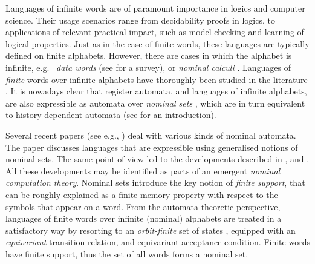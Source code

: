 


Languages of infinite words are of paramount importance in logics and computer science. Their usage scenarios range from decidability proofs in logics, 
 to applications of relevant practical impact, such as model checking and learning of logical properties. Just as in the case of finite words, these languages are typically defined on finite alphabets. However, there are cases in which the alphabet is infinite, e.g.\
\emph{data words} (see \cite{Seg06} for  a survey), or \emph{nominal calculi} \cite{MPW92}. Languages of \emph{finite} words over infinite alphabets have thoroughly been studied in the literature \cite{KF94,Tze11}. 
It is nowadays clear that register automata, and languages of infinite alphabets, are also expressible as automata over \emph{nominal sets} \cite{GP02}, which are in turn equivalent  to history-dependent automata \cite{PISTORE,GADDUCCI,STATON,CIANCIA} (see \cite{CianciaTuostoTR} for an introduction). 

Several recent papers (see e.g., \cite{TOMOYUKI,GABBAYCIANCIA}) deal with various kinds of nominal automata. The paper \cite{MikLICS} discusses languages that are expressible using generalised notions of nominal sets. The same point of view led to the developments described in \cite{MikPOPL12}, and \cite{PittsPOPL13}. All these developments may be identified as parts of an emergent
\emph{nominal computation theory}. Nominal sets introduce the key notion of \emph{finite support}, that can be roughly explained as a finite memory property with respect to the symbols that appear on a word. From the automata-theoretic perspective, languages of finite words over infinite (nominal) alphabets are treated in a satisfactory way by resorting to an \emph{orbit-finite} set of states \cite{CianciaMontanariIC?}, equipped with an \emph{equivariant} transition relation, and equivariant acceptance condition. Finite words have finite support, thus the set of all words forms a nominal set. 

